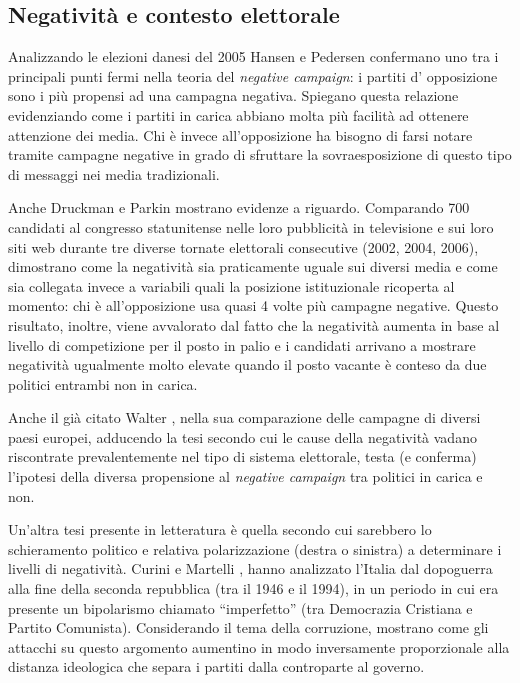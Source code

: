 \subsection{Negatività e contesto elettorale}
Analizzando le elezioni danesi del 2005 Hansen e Pedersen \citep{hansen2008} confermano uno tra i principali punti fermi nella teoria del \textit{negative campaign}: i partiti d' opposizione sono i più propensi ad una campagna negativa. Spiegano questa relazione evidenziando come i partiti in carica abbiano molta più facilità ad ottenere attenzione dei media. Chi è invece all'opposizione ha bisogno di farsi notare tramite campagne negative in grado di sfruttare la sovraesposizione di questo tipo di messaggi nei media tradizionali.

Anche Druckman e Parkin \citep{druckman2010} mostrano evidenze a riguardo. Comparando 700 candidati al congresso statunitense nelle loro pubblicità in televisione e sui loro siti web durante tre diverse tornate elettorali consecutive (2002, 2004, 2006), dimostrano come la negatività sia praticamente uguale sui diversi media e come sia collegata invece a variabili quali la posizione istituzionale ricoperta al momento: chi è all'opposizione usa quasi 4 volte più campagne negative. Questo risultato, inoltre, viene avvalorato dal fatto che la negatività aumenta in base al livello di competizione per il posto in palio e i candidati arrivano a mostrare negatività ugualmente molto elevate quando il posto vacante è conteso da due politici entrambi non in carica.

Anche il già citato Walter \citep{walter2014}, nella sua comparazione delle campagne di diversi paesi europei, adducendo la tesi secondo cui le cause della negatività vadano riscontrate prevalentemente nel tipo di sistema elettorale, testa (e conferma) l'ipotesi della diversa propensione al \textit{negative campaign} tra politici in carica e non.

Un’altra tesi presente in letteratura è quella secondo cui sarebbero lo schieramento politico e relativa polarizzazione (destra o sinistra) a determinare i livelli di negatività. Curini e Martelli  \citep{curini2010}, hanno analizzato l’Italia dal dopoguerra alla fine della seconda repubblica (tra il 1946 e il 1994), in un periodo in cui era presente un bipolarismo chiamato “imperfetto” (tra Democrazia Cristiana e Partito Comunista). Considerando il tema della corruzione, mostrano come gli attacchi su questo argomento aumentino in modo inversamente proporzionale alla distanza ideologica che separa i partiti dalla controparte al governo.

